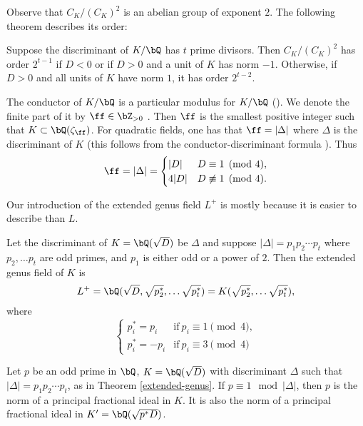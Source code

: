 Observe that $C_K / (C_K)^2$ is an abelian group of exponent $2$. The following theorem describes its order:

\begin{thm}\cite[Ch VI, \S3, Theorem 3.9]{Janusz}
Suppose the discriminant of $K / \bQ$ has $t$ prime divisors. Then $C_K / (C_K)^2$ has order $2^{t-1}$ if $D < 0$ or if $D > 0$ and a unit of $K$ has norm $-1$. Otherwise, if $D > 0$ and all units of $K$ have norm $1$, it has order $2^{t - 2}$.
\end{thm} 

\begin{rem}\label{conductor}
    The conductor of $K / \bQ$ is a particular modulus for $K / \bQ$ (\cite[Ch VI, Definition 6.4]{Neukirch}). We denote the finite part of it by $\ff \in \bZ_{>0}$ . Then $\ff$ is the smallest positive integer such that $K \subset \bQ(\zeta_{\ff})$. For quadratic fields, one has that $\ff = |\Delta|$ where $\Delta$ is the discriminant of $K$ (this follows from the conductor-discriminant formula \cite[Ch VII, (11.9)]{Neukirch}). Thus
\[ \ff = |\Delta| =  \begin{cases} |D| & D \equiv 1 \pmod 4, \\ 4|D| & D \not\equiv 1 \pmod 4. \end{cases} \]
\end{rem}

Our introduction of the extended genus field $L^{+}$ is mostly because it is easier to describe than $L$.

\begin{thm}\label{extended-genus}\cite[Ch VI, \S3, Theorem 3.10]{Janusz}
Let the discriminant of $K = \bQ(\sqrt{D})$ be $\Delta$ and suppose $|\Delta| = p_1 p_2 \cdots p_t$ where $p_2, \ldots p_t$ are odd primes, and $p_1$ is either odd or a power of $2$. Then the extended genus field of $K$ is 
    \[ L^{+} = \bQ(\sqrt{D}, \sqrt{p_2^*}, \ldots \sqrt{p_t^*}) = K(\sqrt{p_2^*}, \ldots \sqrt{p_t^*}), \] 
where 
\[ \begin{cases}
    p_i^* = p_i & \mathrm{if }\ p_i \equiv 1 \pmod 4, \\
    p_i^* = -p_i & \mathrm{if }\ p_i \equiv 3 \pmod 4
\end{cases}\]
\end{thm} 

\vspace{1em}

\begin{cor}\label{p-one-mod-disc}
    Let $p$ be an odd prime in $\bQ$, $K = \bQ(\sqrt{D})$ with discriminant $\Delta$ such that $|\Delta| = p_1 p_2 \cdots p_t$, as in Theorem \ref{extended-genus}. If $p \equiv 1 \mod {|\Delta|}$, then $p$ is the norm of a principal fractional ideal in $K$. 
    It is also the norm of a principal fractional ideal in $K' = \bQ({\sqrt{p^*D}})$.
\end{cor}

